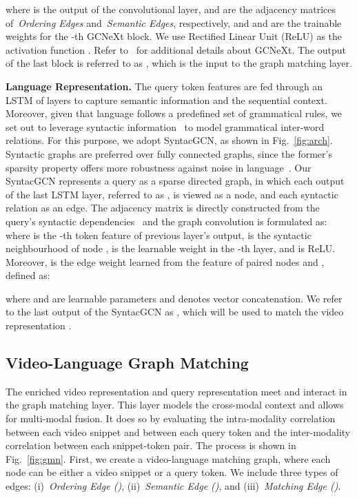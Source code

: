 \documentclass[10pt,twocolumn,letterpaper]{article}
\begin{document}
where  is the output of the convolutional layer,   and  are the adjacency matrices of~\textit{Ordering Edges} and~\textit{Semantic Edges}, respectively, and  and  are the trainable weights for the -th GCNeXt block. 
We use Rectified Linear Unit (ReLU) as the activation function . Refer to~\cite{Xu_2020_CVPR} for additional details about GCNeXt. The output of the last block is referred to as , which is the input to the graph matching layer. 

\noindent\textbf{Language Representation.} The query token features  are fed through an LSTM of  layers to capture semantic information and the sequential
context. Moreover, given that language follows a predefined set of grammatical rules, we set out to leverage syntactic information~\cite{marcheggiani_titov_2017_encoding, zhang_etal_2018_graph} to model grammatical inter-word relations. For this purpose, we adopt SyntacGCN, as shown in Fig.~\ref{fig:arch}. Syntactic graphs are preferred over fully connected graphs, since the former's sparsity property offers more robustness against noise in language~\cite{huang2020aligned}. Our SyntacGCN represents a query as a sparse directed graph, in which each output of the last LSTM layer, referred to as , is viewed as a node, and each syntactic relation as an edge. The adjacency matrix  is directly constructed from the query's syntactic dependencies~\cite{manning2014stanford} and the graph convolution is formulated as: 
where  is the -th token feature of previous layer's output,  is the syntactic neighbourhood of node ,  is the learnable weight in the -th layer, and  is ReLU. Moreover,  is the edge weight learned from the feature of paired nodes  and  , defined as: 

where  and  are learnable parameters and  denotes vector concatenation. We refer to the last output of the SyntacGCN as , which will be used to match the video representation .




\subsection{Video-Language Graph Matching}\label{subsec: Match}
The enriched video representation  and query representation  meet and interact in the graph matching layer. This layer models the cross-modal context and allows for multi-modal fusion. 
It does so by evaluating the intra-modality correlation between each video snippet and between each query token and the inter-modality correlation between each snippet-token pair. 
The process is shown in Fig.~\ref{fig:gmn}. 
First, we create a video-language matching graph, where each node can be either a video snippet or a query token. We include three types of edges: (i)~\textit{Ordering Edge ()}, (ii)~\textit{Semantic Edge ()}, and (iii)~\textit{Matching Edge ()}. 
\end{document}
